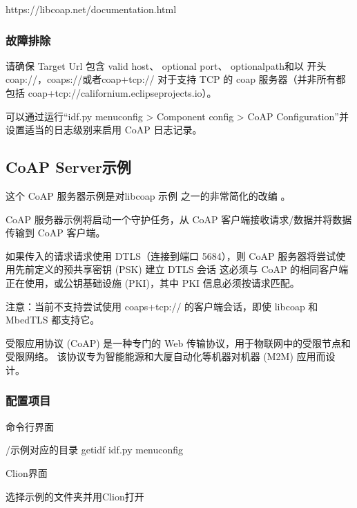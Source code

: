 \documentclass[a4paper,12pt,english]{sphinxmanual}
\begin{document}
{{\sphinxAtStartPar
https://libcoap.net/documentation.html


\subsubsection{故障排除}
\label{\detokenize{exp-esp32/coap:id8}}
\sphinxAtStartPar
请确保 Target Url 包含 valid host、 optional port、 optionalpath和以 开头coap://，coaps://或者coap+tcp:// 对于支持 TCP 的 coap 服务器（并非所有都包括 coap+tcp://californium.eclipseprojects.io）。

\sphinxAtStartPar
可以通过运行“idf.py menuconfig \sphinxhyphen{}> Component config \sphinxhyphen{}> CoAP Configuration”并设置适当的日志级别来启用 CoAP 日志记录。


\subsection{CoAP Server示例}
\label{\detokenize{exp-esp32/coap:coap-server}}
\sphinxAtStartPar
这个 CoAP 服务器示例是对libcoap 示例 之一的非常简化的改编 。

\sphinxAtStartPar
CoAP 服务器示例将启动一个守护任务，从 CoAP 客户端接收请求/数据并将数据传输到 CoAP 客户端。

\sphinxAtStartPar
如果传入的请求请求使用 DTLS（连接到端口 5684），则 CoAP 服务器将尝试使用先前定义的预共享密钥 (PSK) 建立 DTLS 会话 \sphinxhyphen{} 这必须与 CoAP 的相同客户端正在使用，或公钥基础设施 (PKI)，其中 PKI 信息必须按请求匹配。

\sphinxAtStartPar
注意：当前不支持尝试使用 coaps+tcp:// 的客户端会话，即使 libcoap 和 MbedTLS 都支持它。

\sphinxAtStartPar
受限应用协议 (CoAP) 是一种专门的 Web 传输协议，用于物联网中的受限节点和受限网络。
该协议专为智能能源和大厦自动化等机器对机器 (M2M) 应用而设计。


\subsubsection{配置项目}
\label{\detokenize{exp-esp32/coap:id9}}
\sphinxAtStartPar
命令行界面

\begin{sphinxVerbatim}[commandchars=\\\{\}]
 /示例对应的目录
get\PYGZhy{}idf
idf.py menuconfig
\end{sphinxVerbatim}

\sphinxAtStartPar
Clion界面

\sphinxAtStartPar
选择示例的文件夹并用Clion打开

}}
\end{document}
